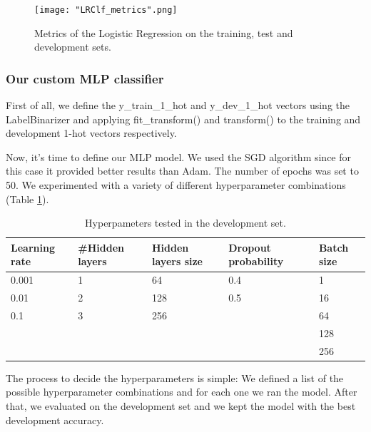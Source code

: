 \documentclass[10pt, a4paper]{article}
\begin{document}
    \begin{figure}
	    \centering
            \texttt{[image: "LRClf\_metrics".png]}
	    \caption{Metrics of the Logistic Regression on the training, test and development sets.}
	    \label{fig::LR_metrics}
     \end{figure}


    \subsubsection{Our custom MLP classifier}

    First of all, we define the y\_train\_1\_hot and y\_dev\_1\_hot vectors using the LabelBinarizer and applying fit\_transform() and transform() to the training and development 1-hot vectors respectively.
    
    Now, it’s time to define our MLP model. We used the SGD algorithm since for this case it provided better results than Adam. The number of epochs was set to 50. We experimented with a variety of different hyperparameter combinations (Table \ref{tab::ex-9-hyper}).

  


\begin{table}
    \centering
    \begin{tabular}{|l|l|l|l|l|}
    \hline
    \rowcolor{blue!25}\textbf{Learning rate} & \cellcolor{blue!25}\textbf{\#Hidden layers} & \cellcolor{blue!25}\textbf{Hidden layers size} & \cellcolor{blue!25}\textbf{Dropout probability} & \cellcolor{blue!25}\textbf{Batch size}\\
    \hline
    0.001 & 1 & 64 & 0.4 & 1\\
    \hline
    0.01 & 2 & 128 & 0.5 & 16\\
    \hline
    0.1 & 3 & 256 & & 64 \\
   \cline{5-5} %
    & & & & 128 \\
    \cline{5-5} %
    

     & & & & 256 \\
    \hline
    \end{tabular}
    \caption{Hyperpameters tested in the development set.}
    \label{tab::ex-9-hyper}
\end{table}

The process to decide the hyperparameters is simple: We defined a list of the possible hyperparameter combinations and for each one we ran the model. After that, we evaluated on the development set and we kept the model with the best development accuracy.
\end{document}
